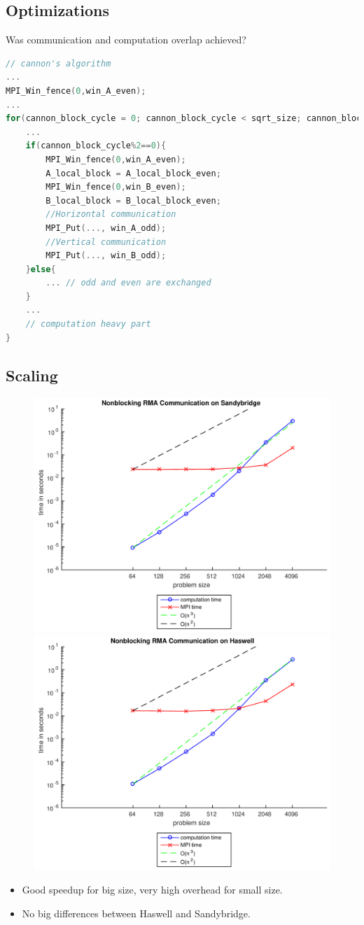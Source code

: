 \documentclass[9pt,pdftex]{beamer}
\begin{document}
\subsection{Optimizations}
\begin{frame}[fragile]{\insertsubsection}
\begin{block}{Was communication and computation overlap achieved?}
\begin{lstlisting}[language=C, basicstyle=\scriptsize, keepspaces=true, columns=flexible]
// cannon's algorithm
...
MPI_Win_fence(0,win_A_even); 
...
for(cannon_block_cycle = 0; cannon_block_cycle < sqrt_size; cannon_block_cycle++){
    ...
    if(cannon_block_cycle%2==0){
        MPI_Win_fence(0,win_A_even);
        A_local_block = A_local_block_even;
        MPI_Win_fence(0,win_B_even);
        B_local_block = B_local_block_even;
        //Horizontal communication
        MPI_Put(..., win_A_odd);
        //Vertical communication
        MPI_Put(..., win_B_odd);
    }else{
        ... // odd and even are exchanged
    }
    ...
    // computation heavy part
}
\end{lstlisting}
\end{block}
\end{frame}

\subsection{Scaling}
\begin{frame}{\insertsubsection}
\begin{figure}
\includegraphics[width=.5\textwidth]{Pictures/Task5SB}
\hfill
\includegraphics[width=.5\textwidth]{Pictures/Task5HW}
\end{figure}
\begin{itemize}
\item Good speedup for big size, very high overhead for small size.
\item No big differences between Haswell and Sandybridge.
\end{itemize}
\end{frame}
\end{document}
